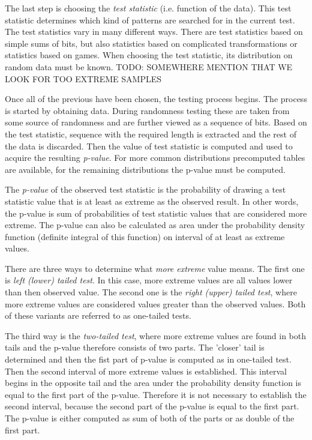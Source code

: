 \documentclass[
  digital,     %
  oneside,     %
  nosansbold,  %
  nocolorbold, %
  nolof,         %
  nolot,         %
]{fithesis4}
\begin{document}
The last step is choosing the \emph{test statistic} (i.e. function of the data). This test statistic determines which kind of patterns are searched for in the current test. The test statistics vary in many different ways. There are test statistics based on simple sums of bits, but also statistics based on complicated transformations or statistics based on games. When choosing the test statistic, its distribution on random data must be known. TODO: SOMEWHERE MENTION THAT WE LOOK FOR TOO EXTREME SAMPLES

Once all of the previous have been chosen, the testing process begins. The process is started by obtaining data. During randomness testing these are taken from some source of randomness and are further viewed as a sequence of bits. Based on the test statistic, sequence with the required length is extracted and the rest of the data is discarded. Then the value of test statistic is computed and used to acquire the resulting \emph{p-value}. For more common distributions precomputed tables are available, for the remaining distributions the p-value must be computed.

The \emph{p-value} of the observed test statistic is the probability of drawing a test statistic value that is at least as extreme as the observed result. In other words, the p-value is sum of probabilities of test statistic values that are considered more extreme. The p-value can also be calculated as area under the probability density function (definite integral of this function) on interval of at least as extreme values.

There are three ways to determine what \emph{more extreme} value means. The first one is \emph{left (lower) tailed test}. In this case, more extreme values are all values lower than then observed value. The second one is the \emph{right (upper) tailed test}, where more extreme values are considered values greater than the observed values. Both of these variants are referred to as one-tailed tests.

The third way is the \emph{two-tailed test}, where more extreme values are found in both tails and the p-value therefore consists of two parts. The 'closer' tail is determined and then the fist part of p-value is computed as in one-tailed test. Then the second interval of more extreme values is established. This interval begins in the opposite tail and the area under the probability density function is equal to the first part of the p-value. Therefore it is not necessary to establish the second interval, because the second part of the p-value is equal to the first part. The p-value is either computed as sum of both of the parts or as double of the first part. 
\end{document}
